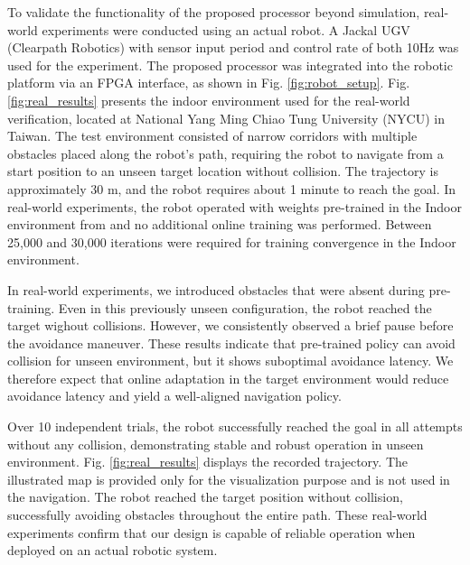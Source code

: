 To validate the functionality of the proposed processor beyond simulation, real-world experiments were conducted using an actual robot. A Jackal UGV (Clearpath Robotics) \cite{jackal} with sensor input period and control rate of both 10Hz was used for the experiment. The proposed processor was integrated into the robotic platform via an FPGA interface, as shown in Fig. \ref{fig:robot_setup}. Fig. \ref{fig:real_results} presents the indoor environment used for the real-world verification, located at National Yang Ming Chiao Tung University (NYCU) in Taiwan. The test environment consisted of narrow corridors with multiple obstacles placed along the robot's path, requiring the robot to navigate from a start position to an unseen target location without collision. The trajectory is approximately 30 m, and the robot requires about 1 minute to reach the goal. In real-world experiments, the robot operated with weights pre-trained in the Indoor environment from \cite{env_others} and no additional online training was performed. Between 25,000 and 30,000 iterations were required for training convergence in the Indoor environment.

In real-world experiments, we introduced obstacles that were absent during pre-training. Even in this previously unseen configuration, the robot reached the target wighout collisions. However, we consistently observed a brief pause before the avoidance maneuver. These results indicate that pre-trained policy can avoid collision for unseen environment, but it shows suboptimal avoidance latency. We therefore expect that online adaptation in the target environment would reduce avoidance latency and yield a well-aligned navigation policy.

Over 10 independent trials, the robot successfully reached the goal in all attempts without any collision, demonstrating stable and robust operation in unseen environment. Fig. \ref{fig:real_results} displays the recorded trajectory. The illustrated map is provided only for the visualization purpose and is not used in the navigation. The robot reached the target position without collision, successfully avoiding obstacles throughout the entire path. These real-world experiments confirm that our design is capable of reliable operation when deployed on an actual robotic system.
 
